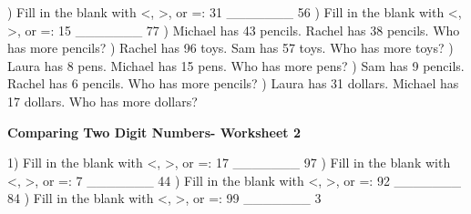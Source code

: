 \documentclass{article}%
\begin{document}
) Fill in the blank with <, >, or =: 31 \_\_\_\_\_\_\_ 56%
\newline%
\newline%
) Fill in the blank with <, >, or =: 15 \_\_\_\_\_\_\_ 77%
\newline%
\newline%
) Michael has 43 pencils. Rachel has 38 pencils. Who has more pencils?%
\newline%
\newline%
) Rachel has 96 toys. Sam has 57 toys. Who has more toys?%
\newline%
\newline%
) Laura has 8 pens. Michael has 15 pens. Who has more pens?%
\newline%
\newline%
) Sam has 9 pencils. Rachel has 6 pencils. Who has more pencils?%
\newline%
\newline%
) Laura has 31 dollars. Michael has 17 dollars. Who has more dollars?%
\newline%
\newline%
\newline%
\pagebreak%
\large%
\begin{center}%
\textbf{Comparing Two Digit Numbers- Worksheet 2}%
\newline%
\end{center} \normalsize%
1) Fill in the blank with <, >, or =: 17 \_\_\_\_\_\_\_ 97%
\newline%
\newline%
) Fill in the blank with <, >, or =: 7 \_\_\_\_\_\_\_ 44%
\newline%
\newline%
) Fill in the blank with <, >, or =: 92 \_\_\_\_\_\_\_ 84%
\newline%
\newline%
) Fill in the blank with <, >, or =: 99 \_\_\_\_\_\_\_ 3%
\newline%
\newline%
\newline%
\end{document}
